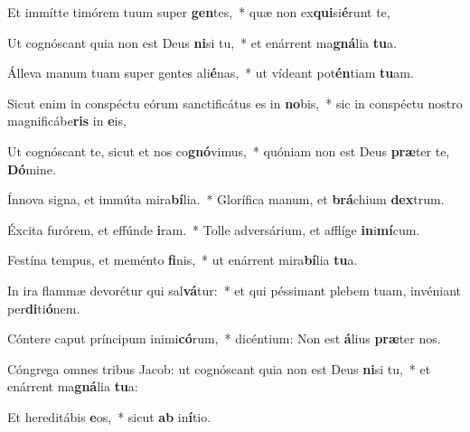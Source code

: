 \item Et immítte timórem tuum super \textbf{gen}tes,~* quæ non ex\textbf{qui}si\textbf{é}runt te,
\item Ut cognóscant quia non est Deus \textbf{ni}si tu,~* et enárrent ma\textbf{gná}lia \textbf{tu}a.
\item Álleva manum tuam super gentes ali\textbf{é}nas,~* ut vídeant pot\textbf{én}tiam \textbf{tu}am.
\item Sicut enim in conspéctu eórum sanctificátus es in \textbf{no}bis,~* sic in conspéctu nostro magnificábe\textbf{ris} in \textbf{e}is,
\item Ut cognóscant te, sicut et nos co\textbf{gnó}vimus,~* quóniam non est Deus \textbf{præ}ter te, \textbf{Dó}mine.
\item Ínnova signa, et immúta mira\textbf{bí}lia.~* Glorífica manum, et \textbf{brá}chium \textbf{dex}trum.
\item Éxcita furórem, et effúnde \textbf{i}ram.~* Tolle adversárium, et afflíge \textbf{in}i\textbf{mí}cum.
\item Festína tempus, et meménto \textbf{fi}nis,~* ut enárrent mira\textbf{bí}lia \textbf{tu}a.
\item In ira flammæ devorétur qui sal\textbf{vá}tur:~* et qui péssimant plebem tuam, invéniant per\textbf{di}ti\textbf{ó}nem.
\item Cóntere caput príncipum inimi\textbf{có}rum,~* dicéntium: Non est \textbf{á}lius \textbf{præ}ter nos.
\item Cóngrega omnes tribus Jacob: ut cognóscant quia non est Deus \textbf{ni}si tu,~* et enárrent ma\textbf{gná}lia \textbf{tu}a:
\item Et hereditábis \textbf{e}os,~* sicut \textbf{ab} in\textbf{í}tio.
